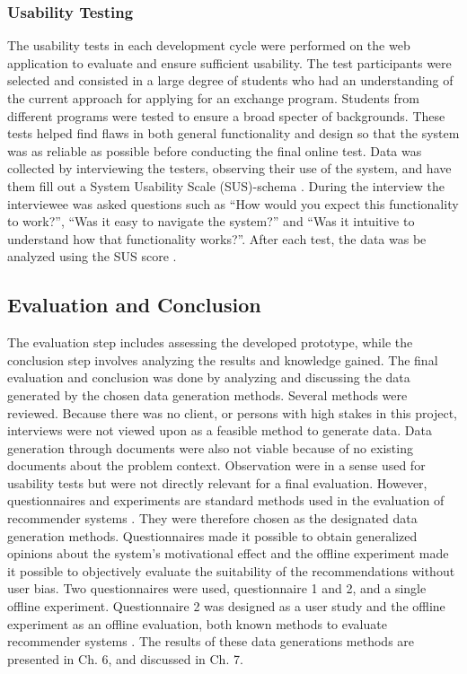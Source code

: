 \subsubsection{Usability Testing}
The usability tests in each development cycle were performed on the web application to evaluate and ensure sufficient usability. The test participants were selected and consisted in a large degree of students who had an understanding of the current approach for applying for an exchange program. Students from different programs were tested to ensure a broad specter of backgrounds. These tests helped find flaws in both general functionality and design so that the system was as reliable as possible before conducting the final online test. Data was collected by interviewing the testers, observing their use of the system, and have them fill out a System Usability Scale (SUS)-schema \cite{brooke1996sus}. During the interview the interviewee was asked questions such as \enquote{How would you expect this functionality to work?}, \enquote{Was it easy to navigate the system?} and \enquote{Was it intuitive to understand how that functionality works?}. After each test, the data was be analyzed using the SUS score \cite{brooke1996sus}.

\subsection{Evaluation and Conclusion}

The evaluation step includes assessing the developed prototype, while the conclusion step involves analyzing the results and knowledge gained. The final evaluation and conclusion was done by analyzing and discussing the data generated by the chosen data generation methods. Several methods were reviewed. Because there was no client, or persons with high stakes in this project, interviews were not viewed upon as a feasible method to generate data. Data generation through documents were also not viable because of no existing documents about the problem context. Observation were in a sense used for usability tests but were not directly relevant for a final evaluation. However, questionnaires and experiments are standard methods used in the evaluation of recommender systems \cite{oates2005researching}. They were therefore chosen as the designated data generation methods. Questionnaires made it possible to obtain generalized opinions about the system's motivational effect and the offline experiment made it possible to objectively evaluate the suitability of the recommendations without user bias. Two questionnaires were used, questionnaire 1 and 2, and a single offline experiment. Questionnaire 2 was designed as a user study and the offline experiment as an offline evaluation, both known methods to evaluate recommender systems \cite{shani2011evaluating}. The results of these data generations methods are presented in Ch. 6, and discussed in Ch. 7. 

